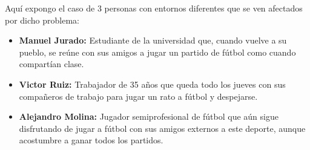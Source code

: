 Aquí expongo el caso de 3 personas con entornos diferentes que se ven afectados por dicho problema:

\begin{itemize}
    \item \textbf{Manuel Jurado:} Estudiante de la universidad que, cuando vuelve a su pueblo, se reúne con sus amigos a jugar un partido de fútbol como cuando compartían clase.
    \item \textbf{Victor Ruiz:} Trabajador de 35 años que queda todo los jueves con sus compañeros de trabajo para jugar un rato a fútbol y despejarse.
    \item \textbf{Alejandro Molina:} Jugador semiprofesional de fútbol que aún sigue disfrutando de jugar a fútbol con sus amigos externos a este deporte, aunque acostumbre a ganar todos los partidos.
\end{itemize}
